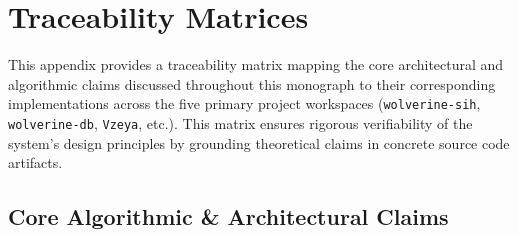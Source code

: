 \chapter{Traceability Matrices}
\label{app:traceability-matrices}

This appendix provides a traceability matrix mapping the core architectural and algorithmic claims discussed throughout this monograph to their corresponding implementations across the five primary project workspaces (\texttt{wolverine-sih}, \texttt{wolverine-db}, \texttt{Vzeya}, etc.). This matrix ensures rigorous verifiability of the system's design principles by grounding theoretical claims in concrete source code artifacts.

\section{Core Algorithmic \& Architectural Claims}

